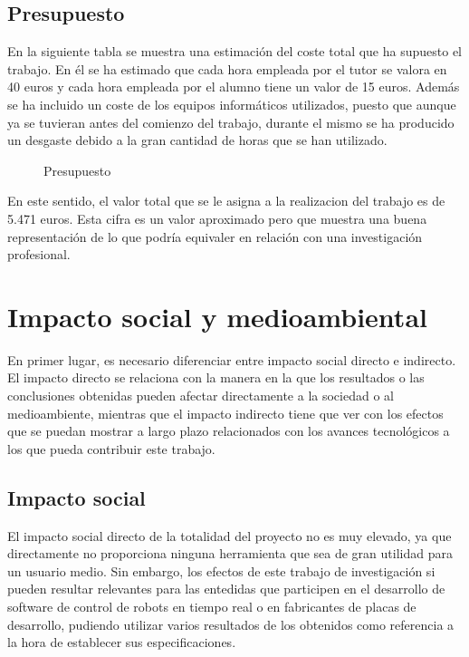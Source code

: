 \documentclass[a4paper,11pt,spanish]{sphinxmanual}
\let\sphinxpxdimen\pdfpxdimen\else\newdimen\sphinxpxdimen
\begin{document}
\section{Presupuesto}
\label{\detokenize{planificacion_temporal_y_presupuesto:presupuesto}}
\sphinxAtStartPar
En la siguiente tabla se muestra una estimación del coste total
que ha supuesto el trabajo. En él se ha estimado que cada hora
empleada por el tutor se valora en 40 euros y cada hora empleada
por el alumno tiene un valor de 15 euros. Además se ha incluido
un coste de los equipos informáticos utilizados, puesto que aunque
ya se tuvieran antes del comienzo del trabajo, durante el mismo se
ha producido un desgaste debido a la gran cantidad de horas que
se han utilizado.

\begin{figure}[htbp]
\centering
\capstart

\noindent\sphinxincludegraphics[width=500\sphinxpxdimen]{{Presupuesto}.PNG}
\caption{Presupuesto}\label{\detokenize{planificacion_temporal_y_presupuesto:id2}}\end{figure}

\sphinxAtStartPar
En este sentido, el valor total que se le asigna a la realizacion
del trabajo es de 5.471 euros. Esta cifra es un valor aproximado
pero que muestra una buena representación de lo que podría
equivaler en relación con una investigación profesional.


\chapter{Impacto social y medioambiental}
\label{\detokenize{impacto_social_y_medioambiental:impacto-social-y-medioambiental}}\label{\detokenize{impacto_social_y_medioambiental::doc}}
\sphinxAtStartPar
En primer lugar, es necesario diferenciar entre impacto social directo e indirecto.
El impacto directo se relaciona con la manera en la que los resultados o las conclusiones
obtenidas pueden afectar directamente a la sociedad o al medioambiente, mientras que el impacto indirecto tiene
que ver con los efectos que se puedan mostrar a largo plazo relacionados con los avances tecnológicos
a los que pueda contribuir este trabajo.


\section{Impacto social}
\label{\detokenize{impacto_social_y_medioambiental:impacto-social}}
\sphinxAtStartPar
El impacto social directo de la totalidad del proyecto no es muy elevado, ya que
directamente no proporciona ninguna herramienta que sea de gran utilidad
para un usuario medio. Sin embargo, los efectos de este trabajo de investigación
si pueden resultar relevantes para las entedidas que participen en el desarrollo de
software de control de robots en tiempo real o en fabricantes de placas de desarrollo,
pudiendo utilizar varios resultados de los obtenidos como referencia a la hora
de establecer sus especificaciones.
\end{document}

